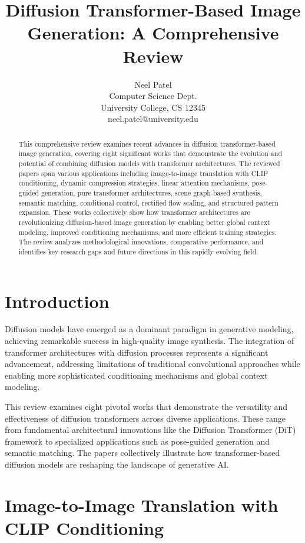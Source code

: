 \documentclass[a4paper]{article}
\title{Diffusion Transformer-Based Image Generation: A Comprehensive Review}
\author{
Neel Patel \\ Computer Science Dept.\\
                University College, CS 12345 \\ neel.patel@university.edu
}
\begin{document}
\maketitle

\begin{abstract}
This comprehensive review examines recent advances in diffusion transformer-based image generation, covering eight significant works that demonstrate the evolution and potential of combining diffusion models with transformer architectures. The reviewed papers span various applications including image-to-image translation with CLIP conditioning, dynamic compression strategies, linear attention mechanisms, pose-guided generation, pure transformer architectures, scene graph-based synthesis, semantic matching, conditional control, rectified flow scaling, and structured pattern expansion. These works collectively show how transformer architectures are revolutionizing diffusion-based image generation by enabling better global context modeling, improved conditioning mechanisms, and more efficient training strategies. The review analyzes methodological innovations, comparative performance, and identifies key research gaps and future directions in this rapidly evolving field.
\end{abstract}

\section{Introduction}

Diffusion models have emerged as a dominant paradigm in generative modeling, achieving remarkable success in high-quality image synthesis. The integration of transformer architectures with diffusion processes represents a significant advancement, addressing limitations of traditional convolutional approaches while enabling more sophisticated conditioning mechanisms and global context modeling.

This review examines eight pivotal works that demonstrate the versatility and effectiveness of diffusion transformers across diverse applications. These range from fundamental architectural innovations like the Diffusion Transformer (DiT) framework to specialized applications such as pose-guided generation and semantic matching. The papers collectively illustrate how transformer-based diffusion models are reshaping the landscape of generative AI.

\section{Image-to-Image Translation with CLIP Conditioning}
\end{document}
